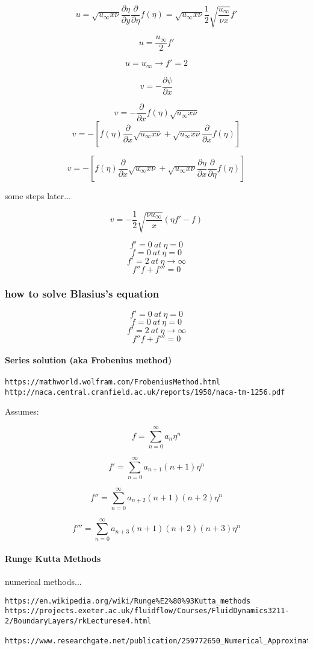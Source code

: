\documentclass[11pt]{article}
\begin{document}
$$u =\sqrt{u_\infty x \nu} \frac{\partial \eta}{\partial y} \frac{\partial}{\partial \eta} f(\eta)= \sqrt{u_\infty x \nu}  \frac{1}{2} \sqrt{\frac{u_\infty}{\nu x}} f'$$

$$u = \frac{u_\infty}{2} f'$$

$$u = u_\infty \rightarrow f'=2$$



$$v= - \frac{\partial \psi}{\partial x}$$

$$v= - \frac{\partial}{\partial x} f(\eta) \sqrt{u_\infty x \nu}$$
$$v= -[f(\eta)\frac{\partial}{\partial x}  \sqrt{u_\infty x \nu}+  \sqrt{u_\infty x \nu} \frac{\partial}{\partial x} f(\eta)]$$

$$v= -[f(\eta)\frac{\partial}{\partial x}  \sqrt{u_\infty x \nu}+  \sqrt{u_\infty x \nu} \frac{\partial \eta}{\partial x} \frac{\partial}{\partial \eta} f(\eta)]$$

some steps later...

$$v= -\frac{1}{2} \sqrt{\frac{\nu u_\infty}{x}}(\eta f' -f)$$

$$f'=0\ at\ \eta=0$$
$$f=0\ at\ \eta=0$$
$$f' =2 \ at \ \eta\rightarrow \infty$$
$$f''f+f'''=0$$

\subsubsection{how to solve Blasius's equation}

$$f'=0\ at\ \eta=0$$
$$f=0\ at\ \eta=0$$
$$f' =2 \ at \ \eta\rightarrow \infty$$
$$f''f+f'''=0$$

\paragraph{Series solution (aka Frobenius method)}

\begin{verbatim}
https://mathworld.wolfram.com/FrobeniusMethod.html
http://naca.central.cranfield.ac.uk/reports/1950/naca-tm-1256.pdf
\end{verbatim}

Assumes:

$$f=\sum_{n=0}^\infty a_n \eta^n$$

$$f'=\sum_{n=0}^\infty a_{n+1} (n+1) \eta^n$$

$$f''=\sum_{n=0}^\infty a_{n+2} (n+1)(n+2) \eta^n$$

$$f'''=\sum_{n=0}^\infty a_{n+3} (n+1)(n+2)(n+3) \eta^n$$

\paragraph{Runge Kutta Methods}
numerical methods...
\begin{verbatim}
https://en.wikipedia.org/wiki/Runge%E2%80%93Kutta_methods 
https://projects.exeter.ac.uk/fluidflow/Courses/FluidDynamics3211-2/BoundaryLayers/rkLecturese4.html

https://www.researchgate.net/publication/259772650_Numerical_Approximations_of_Blasius_Boundary_Layer_Equation
\end{verbatim}
\end{document}
